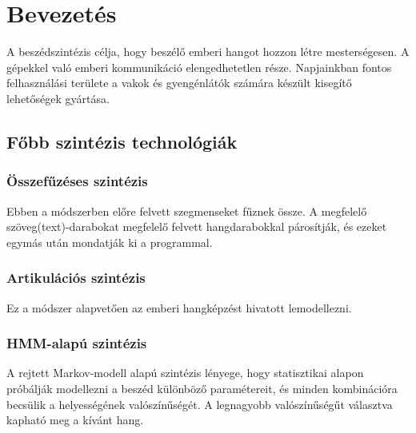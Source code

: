 \section{Bevezetés}

A beszédszintézis célja, hogy beszélő emberi hangot hozzon létre mesterségesen. A gépekkel való emberi kommunikáció elengedhetetlen része. Napjainkban fontos felhasználási területe a vakok és gyengénlátók számára készült kisegítő lehetőségek gyártása.

\subsection{Főbb szintézis technológiák}
\subsubsection{Összefűzéses szintézis}
Ebben a módszerben előre felvett szegmenseket fűznek össze. A megfelelő szöveg(text)-darabokat megfelelő felvett hangdarabokkal párosítják, és ezeket egymás után mondatják ki a programmal.
\subsubsection{Artikulációs szintézis}
Ez a módszer alapvetően az emberi hangképzést hivatott lemodellezni.
\subsubsection{HMM-alapú szintézis}
A rejtett Markov-modell alapú szintézis lényege, hogy statisztikai alapon próbálják modellezni a beszéd különböző paramétereit, és minden kombinációra becsülik a helyességének valószínűségét. A legnagyobb valószínűségűt választva kapható meg a kívánt hang.